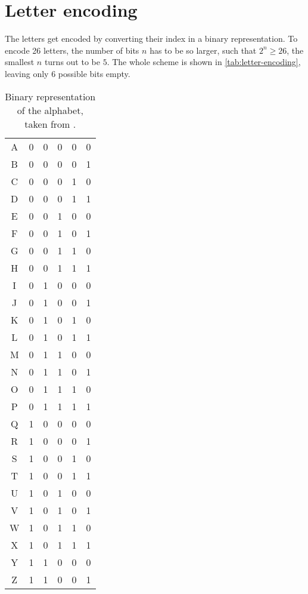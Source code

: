 \section{Letter encoding}
\label{sec:letter-encoding}
The letters get encoded by converting their index in a binary representation. To encode 26 letters,
the number of bits $n$ has to be so larger, such that $2^n \geq 26$, the smallest $n$ turns out to
be $5$. The whole scheme is shown in \autoref{tab:letter-encoding}, leaving only $6$ possible bits
empty.

\begin{table}
  \centering
  \caption{Binary representation of the alphabet, taken from \cite{thor_manual}.}
  \label{tab:letter-encoding}
  \begin{tabular}{c | c c c c c}
    A & 0 & 0 & 0 & 0 & 0 \\
    B & 0 & 0 & 0 & 0 & 1 \\
    C & 0 & 0 & 0 & 1 & 0 \\
    D & 0 & 0 & 0 & 1 & 1 \\
    E & 0 & 0 & 1 & 0 & 0 \\
    F & 0 & 0 & 1 & 0 & 1 \\
    G & 0 & 0 & 1 & 1 & 0 \\
    H & 0 & 0 & 1 & 1 & 1 \\
    I & 0 & 1 & 0 & 0 & 0 \\
    J & 0 & 1 & 0 & 0 & 1 \\
    K & 0 & 1 & 0 & 1 & 0 \\
    L & 0 & 1 & 0 & 1 & 1 \\
    M & 0 & 1 & 1 & 0 & 0 \\
    N & 0 & 1 & 1 & 0 & 1 \\
    O & 0 & 1 & 1 & 1 & 0 \\
    P & 0 & 1 & 1 & 1 & 1 \\
    Q & 1 & 0 & 0 & 0 & 0 \\
    R & 1 & 0 & 0 & 0 & 1 \\
    S & 1 & 0 & 0 & 1 & 0 \\
    T & 1 & 0 & 0 & 1 & 1 \\
    U & 1 & 0 & 1 & 0 & 0 \\
    V & 1 & 0 & 1 & 0 & 1 \\
    W & 1 & 0 & 1 & 1 & 0 \\
    X & 1 & 0 & 1 & 1 & 1 \\
    Y & 1 & 1 & 0 & 0 & 0 \\
    Z & 1 & 1 & 0 & 0 & 1 \\
  \end{tabular}
\end{table}

